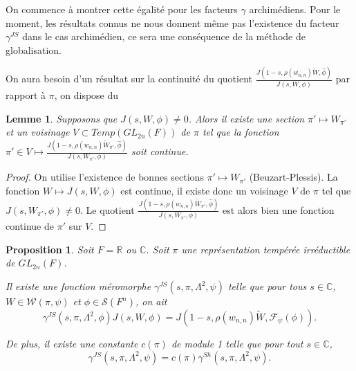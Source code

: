 \documentclass{amsart}
\newtheorem{proposition}{Proposition}[section]
\newtheorem{lemme}{Lemme}[section]
\begin{document}
 On commence à montrer cette égalité pour les facteurs $\gamma$ archimédiens. Pour le moment, les résultats connus ne nous donnent même pas l'existence du facteur $\gamma^{JS}$ dans le cas archimédien, ce sera une conséquence de la méthode de globalisation.
 
 On aura besoin d'un résultat sur la continuité du quotient $\frac{J(1-s, \rho(w_{n,n})\tilde{W}, \hat{\phi})}{J(s, W, \phi)}$ par rapport à $\pi$, on dispose du
 \begin{lemme}
 \label{cont}
 Supposons que $J(s, W, \phi) \neq 0$. Alors il existe une section $\pi' \mapsto W_{\pi'}$ et un voisinage $V \subset Temp(GL_{2n}(F))$ de $\pi$ tel que la fonction $\pi' \in V \mapsto \frac{J(1-s, \rho(w_{n,n})\tilde{W}_{\pi'}, \hat{\phi})}{J(s, W_{\pi'}, \phi)}$ soit continue.
 \end{lemme}
 
 \begin{proof}
 On utilise l'existence de bonnes sections $\pi' \mapsto W_{\pi'}$ (Beuzart-Plessis). La fonction $W \mapsto J(s, W, \phi)$ est continue, il existe donc un voisinage $V$ de $\pi$ tel que $J(s, W_{\pi'}, \phi) \neq 0$. Le quotient $\frac{J(1-s, \rho(w_{n,n})\tilde{W}_{\pi'}, \hat{\phi})}{J(s, W_{\pi'}, \phi)}$ est alors bien une fonction continue de $\pi'$ sur $V$. 
 \end{proof}
 
 \begin{proposition}
 \label{proparch}
 Soit $F = \mathbb{R}$ ou $\mathbb{C}$. Soit $\pi$ une représentation tempérée irréductible de $GL_{2n}(F)$. 
 
 Il existe une fonction méromorphe $\gamma^{JS}(s,\pi,\Lambda^2,\psi)$ telle que pour tous $s \in \mathbb{C}$, $W \in \mathcal{W}(\pi, \psi)$ et $\phi \in \mathcal{S}(F^n)$, on ait
 \begin{equation}
 \gamma^{JS}(s, \pi, \Lambda^2, \phi) J(s, W, \phi) = J(1-s, \rho(w_{n,n})\tilde{W}, \mathcal{F}_\psi(\phi)).
 \end{equation}
 
 De plus, il existe une constante $c(\pi)$ de module 1 telle que pour tout $s \in \mathbb{C}$,
 \begin{equation}
 \gamma^{JS}(s, \pi, \Lambda^2, \psi) = c(\pi)\gamma^{Sh}(s, \pi, \Lambda^2, \psi).
 \end{equation}
 \end{proposition}
 
\end{document}
